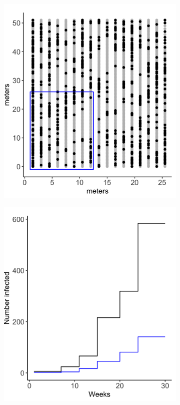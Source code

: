 \documentclass{uwstat572}
\begin{document}
\begin{figure}[h]
	\centering
	\begin{subfigure}[b]{0.45\textwidth}
		\includegraphics[width=\textwidth]{figures/figure_1a.png}
		\caption{}
		\label{fig:plants_locations}
	\end{subfigure}
	\hfill
	\begin{subfigure}[b]{0.45\textwidth}
		\includegraphics[width=\textwidth]{figures/figure_1b.png}

\end{subfigure}
\end{figure}
\end{document}
